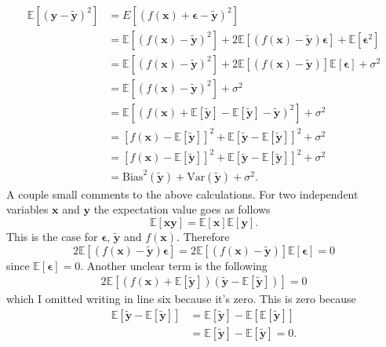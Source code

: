 \documentclass[uio,jmp,amsmath,amssymb,reprint,nofootinbib]{revtex4-1}
\numberwithin{equation}{section}
\begin{document}
\begin{align*}
\mathbb{E}[(\bm{y}-\bm{\tilde{y}})^2]& = E[(f(\bm{x})+\bm{\epsilon}-\bm{\tilde{y}})^2] \\
&= \mathbb{E}[(f(\bm{x})-\bm{\tilde{y}})^2]+2\mathbb{E}[(f(\bm{x})-\bm{\tilde{y}})\bm{\epsilon}]+\mathbb{E}[\bm{\epsilon}^2]\\
&= \mathbb{E}[(f(\bm{x})-\bm{\tilde{y}})^2]+2\mathbb{E}[(f(\bm{x})-\bm{\tilde{y}})]\mathbb{E}[\bm{\epsilon}]+\sigma^2 \\
&= \mathbb{E}[(f(\bm{x})-\bm{\tilde{y}})^2] + \sigma^2 \\
&= \mathbb{E}[(f(\bm{x}) + \mathbb{E}[\bm{\tilde{y}}] - \mathbb{E}[\bm{\tilde{y}}] - \bm{\tilde{y}})^2] + \sigma^2\\
&= \left[f(\bm{x}) - \mathbb{E}[\bm{\tilde{y}}] \right]^2 + \mathbb{E}\left[\bm{\tilde{y}} - \mathbb{E}[\bm{\tilde{y}}] \right]^2 + \sigma^2\\
&= \left[f(\bm{x}) - \mathbb{E}[\bm{\tilde{y}}] \right]^2 + \mathbb{E}\left[\bm{\tilde{y}} - \mathbb{E}[\bm{\tilde{y}}] \right]^2 + \sigma^2\\
&= \text{Bias}^2(\bm{\tilde{y}}) + \text{Var}(\bm{\tilde{y}}) +  \sigma^2.
\end{align*}
A couple small comments to the above calculations. For two independent variables \(\bm{x}\) and \(\bm{y}\) the expectation value goes as follows
\begin{equation}
\mathbb{E}[\bm{xy}] = \mathbb{E}[\bm{x}]\mathbb{E}[\bm{y}].
\end{equation}
This is the case for \(\bm{\epsilon}\), \(\bm{\tilde{y}}\) and \(f(\bm{x})\). Therefore
\begin{equation}
2\mathbb{E}[(f(\bm{x})-\bm{\tilde{y}})\bm{\epsilon}] = 2\mathbb{E}[(f(\bm{x})-\bm{\tilde{y}})]\mathbb{E}[\bm{\epsilon}] = 0
\end{equation}
since \(\mathbb{E}[\bm{\epsilon}] = 0\). Another unclear term is the following
\begin{align}
2\mathbb{E}\left[ \left(f(\bm{x}) + \mathbb{E}[\bm{\tilde{y}}]\right)\left( \bm{\tilde{y}} - \mathbb{E}[\bm{\tilde{y}}]\right) \right] = 0
\end{align}
which I omitted writing in line six because it's zero. This is zero because
\begin{align}
\mathbb{E}\left[ \bm{\tilde{y}} - \mathbb{E}[\bm{\tilde{y}}]\right] &= \mathbb{E}[\bm{\tilde{y}}] - \mathbb{E}[\mathbb{E}[\bm{\tilde{y}}]]\\
&= \mathbb{E}[\bm{\tilde{y}}] - \mathbb{E}[\bm{\tilde{y}}] = 0.
\end{align}



\end{document}
